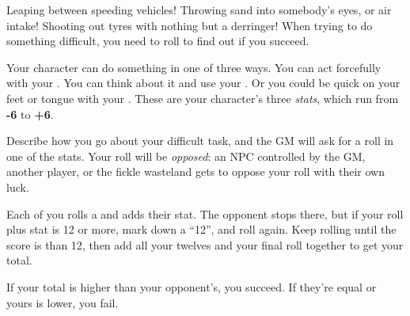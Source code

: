 
Leaping between speeding vehicles! Throwing sand into somebody's eyes, or air intake! Shooting out tyres with nothing but a derringer! When trying to do something difficult, you need to roll to find out if you succeed.

Your character can do something in one of three ways. You can act forcefully with your . You can think about it and use your . Or you could be quick on your feet or tongue with your . These are your character's three \emph{stats}, which run from \textbf{-6} to \textbf{+6}.

Describe how you go about your difficult task, and the GM will ask for a roll in one of the stats. Your roll will be \emph{opposed}: an NPC controlled by the GM, another player, or the fickle wasteland gets to oppose your roll with their own luck.

Each of you rolls a  and adds their stat. The opponent stops there, but if your roll plus stat is 12 or more, mark down a ``12'', and roll again. Keep rolling until the score is than 12, then add all your twelves and your final roll together to get your total.

If your total is higher than your opponent's, you succeed. If they're equal or yours is lower, you fail.
